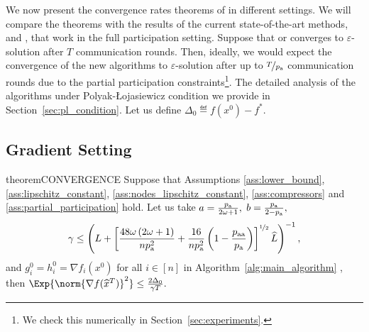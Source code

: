\documentclass{article}
\newcommand{\algorithmname}{DASHA-PP}
\newcommand*{\probavailable}{\ensuremath{p_{\textnormal{a}}}}
\newcommand*{\probpairaa}{\ensuremath{p_{\textnormal{aa}}}}
\begin{document}
We now present the convergence rates theorems of \algname{\algorithmname} in different settings. We will compare the theorems with the results of the current state-of-the-art methods,  and , that work in the full participation setting. Suppose that  or  converges to $\varepsilon$-solution after $T$ communication rounds. Then, ideally, we would expect the convergence of the new algorithms to $\varepsilon$-solution after up to $\nicefrac{T}{\probavailable}$ communication rounds due to the partial participation constraints\footnote{We check this numerically in Section~\ref{sec:experiments}.}. The detailed analysis of the algorithms under Polyak-\L ojasiewicz condition we provide in Section~\ref{sec:pl_condition}. Let us define $\Delta_0 \eqdef f(x^0) - f^*.$

\subsection{Gradient Setting}

\label{sec:gradien_setting}

\begin{restatable}{theorem}{CONVERGENCE}
  \label{theorem:gradient_oracle}
  Suppose that Assumptions \ref{ass:lower_bound}, \ref{ass:lipschitz_constant}, \ref{ass:nodes_lipschitz_constant}, \ref{ass:compressors} and \ref{ass:partial_participation} hold. Let us take $a = \frac{\probavailable}{2 \omega + 1} ,$ $b = \frac{\probavailable}{2 - \probavailable},$ {\scriptsize \begin{align*}\gamma \leq \left(L + \left[\frac{48 \omega \left(2 \omega + 1\right)}{n \probavailable^2} + \frac{16}{n \probavailable^2}\left(1 - \frac{\probpairaa}{\probavailable}\right)\right]^{\nicefrac{1}{2}}\widehat{L}\right)^{-1},\end{align*}} and $g^{0}_i = h^{0}_i = \nabla f_i(x^0)$ for all $i \in [n]$
  in Algorithm~\ref{alg:main_algorithm} \algname{(\algorithmname)}, then $\Exp{\norm{\nabla f(\widehat{x}^T)}^2} \leq \frac{2 \Delta_0}{\gamma T}.$
\end{restatable}
\end{document}
